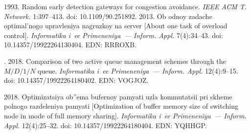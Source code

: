   \begin{multicols}{2}

\renewcommand{\bibname}{\protect\rmfamily References}

{\small\frenchspacing
 {%
 \begin{thebibliography}{99} 
 1993. Random early detection gateways for congestion avoidance. 
\textit{IEEE ACM T. Network.} 1:397--413. doi: 10.1109/90.251892.
 2013. Ob odnoy zadache optimal'nogo upravleniya nagruzkoy na server [About one 
task of overload control]. \textit{Informatika i~ee Primeneniya~--- Inform. Appl.} 7(4):34--43. doi: 
10.14357/19922264130404. EDN: RRROXB.

. 2018. Comparison of two active queue management schemes 
through the $M/D/1/N$ queue. \textit{Informatika i~ee Primeneniya~--- Inform. Appl.} 12(4):9--15. doi: 
10.14357/19922264180402. EDN: VOGJOZ.

  2018. Optimizatsiya ob''ema bufernoy pamyati uzla kommutatsii pri skheme polnogo 
razdeleniya pamyati [Optimization of buffer memory size of switching node in mode of full memory sharing]. 
\textit{Informatika i~ee Primeneniya~--- Inform. Appl.} 12(4):25--32. doi: 10.14357/19922264180404. EDN: 
YQHHGP.


\end{thebibliography}}}
\end{multicols}
